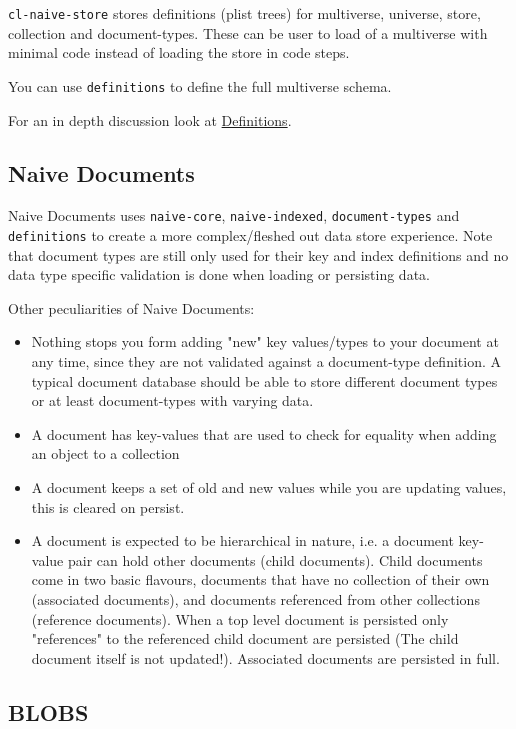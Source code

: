 \documentclass[11pt]{article}
\begin{document}
\texttt{cl-naive-store} stores definitions (plist trees) for multiverse,
universe, store, collection and document-types. These can be user to
load of a multiverse with minimal code instead of loading the store in
code steps.

You can use \texttt{definitions} to define the full multiverse schema.

For an in depth discussion look at \href{definitions.org}{Definitions}.

\subsection{Naive Documents}
\label{sec:org7e776d8}

Naive Documents uses \texttt{naive-core}, \texttt{naive-indexed}, \texttt{document-types}
and \texttt{definitions} to create a more complex/fleshed out data store
experience. Note that document types are still only used for their key
and index definitions and no data type specific validation is done
when loading or persisting data.

Other peculiarities of Naive Documents:

\begin{itemize}
\item Nothing stops you form adding "new" key values/types to your
document at any time, since they are not validated against a
document-type definition. A typical document database should be able
to store different document types or at least document-types with
varying data.
\item A document has key-values that are used to check for equality when
adding an object to a collection
\item A document keeps a set of old and new values while you are updating
values, this is cleared on persist.
\item A document is expected to be hierarchical in nature, i.e. a document
key-value pair can hold other documents (child documents). Child
documents come in two basic flavours, documents that have no
collection of their own (associated documents), and documents
referenced from other collections (reference documents). When a top
level document is persisted only "references" to the referenced
child document are persisted (The child document itself is not
updated!). Associated documents are persisted in full.
\end{itemize}

\subsection{BLOBS}
\label{sec:org0d23455}
\end{document}

